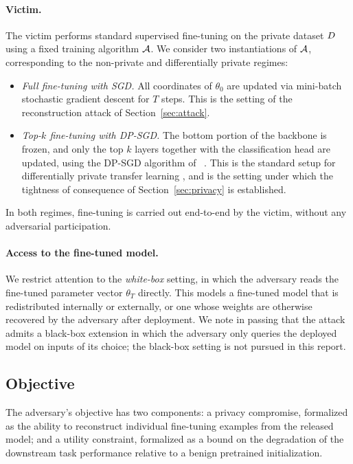 \paragraph{Victim.} The victim performs standard supervised fine-tuning on the private dataset $D$ using a fixed training algorithm $\mathcal{A}$. We consider two instantiations of $\mathcal{A}$, corresponding to the non-private and differentially private regimes:

\begin{itemize}[leftmargin=*, itemsep=2pt, topsep=2pt]
    \item \emph{Full fine-tuning with SGD.} All coordinates of $\theta_0$ are updated via mini-batch stochastic gradient descent for $T$ steps. This is the setting of the reconstruction attack of Section~\ref{sec:attack}.
    \item \emph{Top-$k$ fine-tuning with DP-SGD.} The bottom portion of the backbone is frozen, and only the top $k$ layers together with the classification head are updated, using the DP-SGD algorithm of ~\citet{abadi2016deep}. This is the standard setup for differentially private transfer learning \citep{tramer2020differentially}, and is the setting under which the tightness of consequence of Section~\ref{sec:privacy} is established.
\end{itemize}

In both regimes, fine-tuning is carried out end-to-end by the victim, without any adversarial participation.

\paragraph{Access to the fine-tuned model.}
We restrict attention to the \emph{white-box} setting, in which the adversary reads the fine-tuned parameter vector $\theta_T$ directly. This models a fine-tuned model that is redistributed internally or externally, or one whose weights are otherwise recovered by the adversary after deployment. We note in passing that the attack admits a black-box extension in which the adversary only queries the  deployed model on inputs of its choice; the black-box setting is not pursued in this report.

\subsection{Objective}
\label{sec:goal}

The adversary's objective has two components: a privacy compromise, formalized as the ability to reconstruct individual fine-tuning examples from the released model; and a utility constraint, formalized as a bound on the degradation of the downstream task performance relative to a benign pretrained initialization.

